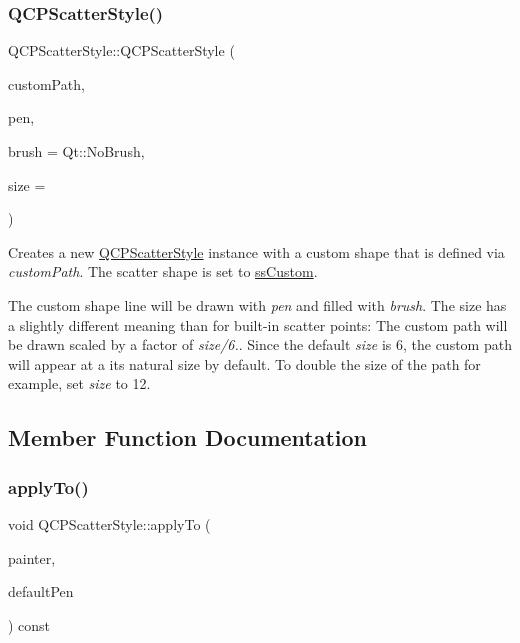 \subsubsection{\texorpdfstring{Q\+C\+P\+Scatter\+Style()}{QCPScatterStyle()}\hspace{0.1cm}{\footnotesize\ttfamily [7/7]}}
{\footnotesize\ttfamily Q\+C\+P\+Scatter\+Style\+::\+Q\+C\+P\+Scatter\+Style (\begin{DoxyParamCaption}\item[{const Q\+Painter\+Path \&}]{custom\+Path,  }\item[{const Q\+Pen \&}]{pen,  }\item[{const Q\+Brush \&}]{brush = {\ttfamily Qt\+:\+:NoBrush},  }\item[{double}]{size = {} }\end{DoxyParamCaption})}

Creates a new \mbox{\hyperlink{class_q_c_p_scatter_style}{Q\+C\+P\+Scatter\+Style}} instance with a custom shape that is defined via {\itshape custom\+Path}. The scatter shape is set to \mbox{\hyperlink{class_q_c_p_scatter_style_adb31525af6b680e6f1b7472e43859349a15d9bcfd9de94edda949006529f9219d}{ss\+Custom}}.

The custom shape line will be drawn with {\itshape pen} and filled with {\itshape brush}. The size has a slightly different meaning than for built-\/in scatter points\+: The custom path will be drawn scaled by a factor of {\itshape size/6.}. Since the default {\itshape size} is 6, the custom path will appear at a its natural size by default. To double the size of the path for example, set {\itshape size} to 12. 

\subsection{Member Function Documentation}
\mbox{\label{class_q_c_p_scatter_style_afd8044ece445300499ca0dc164821e0f}} 
\subsubsection{\texorpdfstring{apply\+To()}{applyTo()}}
{\footnotesize\ttfamily void Q\+C\+P\+Scatter\+Style\+::apply\+To (\begin{DoxyParamCaption}\item[{\mbox{\hyperlink{class_q_c_p_painter}{Q\+C\+P\+Painter}} $\ast$}]{painter,  }\item[{const Q\+Pen \&}]{default\+Pen }\end{DoxyParamCaption}) const}

